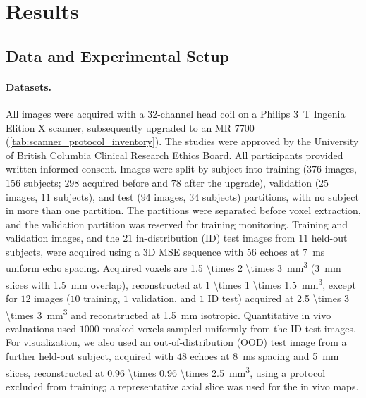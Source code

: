 \section{Results}\label{sec:results}

\subsection{Data and Experimental Setup}\label{subsec:experimental_setup}

\paragraph*{Datasets.}
All images were acquired with a 32-channel head coil on a Philips \SI{3}{T} Ingenia Elition X scanner, subsequently upgraded to an MR 7700 (\cref{tab:scanner_protocol_inventory}).
The studies were approved by the University of British Columbia Clinical Research Ethics Board.
All participants provided written informed consent.
Images were split by subject into training ($\num{376}$ images, $156$ subjects; $298$ acquired before and $78$ after the upgrade), validation ($25$ images, $11$ subjects), and test ($94$ images, $34$ subjects) partitions, with no subject in more than one partition.
The partitions were separated before voxel extraction, and the validation partition was reserved for training monitoring.
Training and validation images, and the $21$ in-distribution (ID) test images from $11$ held-out subjects, were acquired using a 3D \gls*{MSE} sequence with $56$ echoes at \SI{7}{\ms} uniform echo spacing.
Acquired voxels are \SI[parse-numbers=false]{1.5 \times 2 \times 3}{\milli\meter\cubed} (\SI{3}{\milli\meter} slices with \SI{1.5}{\milli\meter} overlap), reconstructed at \SI[parse-numbers=false]{1 \times 1 \times 1.5}{\milli\meter\cubed}, except for $12$ images ($10$ training, $1$ validation, and $1$ ID test) acquired at \SI[parse-numbers=false]{2.5 \times 3 \times 3}{\milli\meter\cubed} and reconstructed at \SI{1.5}{\milli\meter} isotropic.
Quantitative in vivo evaluations used $\num{1000}$ masked voxels sampled uniformly from the ID test images.
For visualization, we also used an out-of-distribution (OOD) test image from a further held-out subject, acquired with $48$ echoes at \SI{8}{\ms} spacing and \SI{5}{\milli\meter} slices, reconstructed at \SI[parse-numbers=false]{0.96 \times 0.96 \times 2.5}{\milli\meter\cubed}, using a protocol excluded from training;
a representative axial slice was used for the in vivo maps.

\begin{table}[htbp]
    \centering
    \caption{Image counts by scanner and acquisition parameters for each partition.}
    \label{tab:scanner_protocol_inventory}
    
\end{table}

